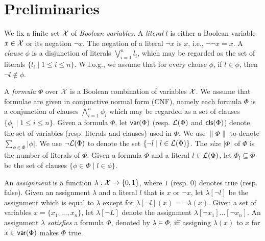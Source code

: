 \section{Preliminaries}\label{sec:prel}

We fix a finite set  $\mathcal{X}$ of \emph{Boolean variables}.
A \emph{literal} $l$ is either a Boolean variable $x\in \mathcal{X}$ or its negation $\neg x$.
The negation of a literal $\neg x$ is $x$, i.e., $\neg\neg x=x$.
A \emph{clause} $\phi$ is a disjunction of literals $\bigvee_{i=1}^n l_i$, which may be regarded as
the set of literals $\{l_i\mid 1\leq i\leq n\}$. W.l.o.g., we assume that for every
clause $\phi$, if $l\in\phi$, then $\neg l\not\in \phi$.

A \emph{formula} $\Phi$ over $\mathcal{X}$ is a Boolean combination of variables $\mathcal{X}$.
We assume that formulae are given in conjunctive normal
form (CNF), namely each formula $\Phi$ is a conjunction of clauses $\bigwedge_{i=1}^n\phi_i$ which may be regarded as a set of clauses $\{\phi_i\mid 1\leq i\leq n\}$. Given a formula $\Phi$, let $\textsf{var}(\Phi)$ (resp. ${\cal L}(\Phi)$  and $\textsf{cls}(\Phi)$) denote the set of variables (resp. literals and clauses) used in $\Phi$.
We use $\|\Phi\|$ to denote $\sum_{\phi\in\Phi}|\phi|$.
We use $\neg{\cal L}(\Phi)$ to denote the set $\{\neg l \mid l\in {\cal L}(\Phi)\}$.
The \emph{size} $|\Phi|$ of $\Phi$ is the number of literals of $\Phi$.
Given a formula $\Phi$ and a literal $l\in{\cal L}(\Phi)$,
let $\Phi_{l}\subseteq \Phi$ be the set of clauses $\{\phi\in\Phi\mid l\in\phi\}$.


An \emph{assignment} is a function $\lambda: \mathcal{X} \rightarrow \{0,1\}$, where $1$ (resp. $0$) denotes true (resp. false).
Given an assignment $\lambda$ and a literal $l$ that is $x$ or $\neg x$, let $\lambda[\neg l]$ be the assignment which is equal to $\lambda$
except for $\lambda[\neg l](x)=\neg \lambda(x)$. Given a set of variables $x=\{x_1,...,x_n\}$, let $\lambda[\neg L]$ denote the assignment
$\lambda[\neg x_1]...[\neg x_n]$.
An assignment $\lambda$ \emph{satisfies} a formula $\Phi$, denoted by $\lambda\models \Phi$, iff assigning $\lambda(x)$ to $x$ for $x\in\textsf{var}(\Phi)$ makes $\Phi$ true.

